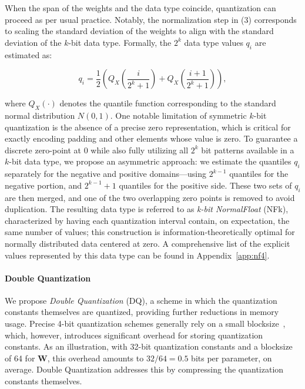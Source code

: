 When the span of the weights and the data type coincide, quantization can proceed as per usual practice. Notably, the normalization step in (3) corresponds to scaling the standard deviation of the weights to align with the standard deviation of the $k$-bit data type. Formally, the $2^k$ data type values $q_i$ are estimated as:

\begin{equation}
q_i  = \frac{1}{2}\left( Q_X\left(\frac{i}{2^k+1}\right) + Q_X\left(\frac{i+1}{2^k+1}\right)\right),
\end{equation}

where $Q_X(\cdot)$ denotes the quantile function corresponding to the standard normal distribution $N(0,1)$. One notable limitation of symmetric $k$-bit quantization is the absence of a precise zero representation, which is critical for exactly encoding padding and other elements whose value is zero. To guarantee a discrete zero-point at $0$ while also fully utilizing all $2^k$ bit patterns available in a $k$-bit data type, we propose an asymmetric approach: we estimate the quantiles $q_i$ separately for the negative and positive domains—using $2^{k-1}$ quantiles for the negative portion, and $2^{k-1} + 1$ quantiles for the positive side. These two sets of $q_i$ are then merged, and one of the two overlapping zero points is removed to avoid duplication. The resulting data type is referred to as \emph{k-bit NormalFloat} (NFk), characterized by having each quantization interval contain, on expectation, the same number of values; this construction is information-theoretically optimal for normally distributed data centered at zero. A comprehensive list of the explicit values represented by this data type can be found in Appendix~\ref{app:nf4}.

\paragraph{Double Quantization{}} 
We propose \emph{Double Quantization} (DQ), a scheme in which the quantization constants themselves are quantized, providing further reductions in memory usage. Precise 4-bit quantization schemes generally rely on a small blocksize~\citep{dettmers2022case}, which, however, introduces significant overhead for storing quantization constants. As an illustration, with 32-bit quantization constants and a blocksize of 64 for $\mathbf{W}$, this overhead amounts to $32/64 = 0.5$ bits per parameter, on average. Double Quantization addresses this by compressing the quantization constants themselves.

